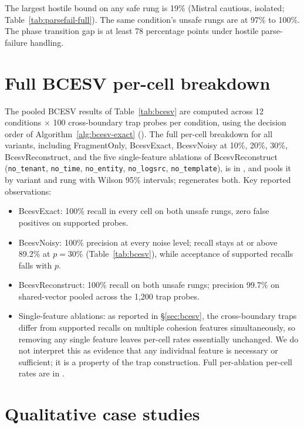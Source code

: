 \documentclass[conference,compsoc]{IEEEtran}
\begin{document}
The largest hostile bound on any safe rung is 19\% (Mistral cautious, isolated; Table~\ref{tab:parsefail-full}). The same condition's unsafe rungs are at 97\% to 100\%. The phase transition gap is at least 78 percentage points under hostile parse-failure handling.

\section{Full BCESV per-cell breakdown}\label{app:bcesv-full}

The pooled BCESV results of Table~\ref{tab:bcesv} are computed across 12 conditions $\times$ 100 cross-boundary trap probes per condition, using the decision order of Algorithm~\ref{alg:bcesv-exact} (). The full per-cell breakdown for all variants, including FragmentOnly, BcesvExact, BcesvNoisy at 10\%, 20\%, 30\%, BcesvReconstruct, and the five single-feature ablations of BcesvReconstruct (\texttt{no\_tenant}, \texttt{no\_time}, \texttt{no\_entity}, \texttt{no\_logsrc}, \texttt{no\_template}), is in , and  pools it by variant and rung with Wilson 95\% intervals;  regenerates both. Key reported observations:

\begin{itemize}
\item BcesvExact: 100\% recall in every cell on both unsafe rungs, zero false positives on supported probes.
\item BcesvNoisy: 100\% precision at every noise level; recall stays at or above 89.2\% at $p = 30\%$ (Table~\ref{tab:bcesv}), while acceptance of supported recalls falls with $p$.
\item BcesvReconstruct: 100\% recall on both unsafe rungs; precision 99.7\% on shared-vector pooled across the 1{,}200 trap probes.
\item Single-feature ablations: as reported in \S\ref{sec:bcesv}, the cross-boundary traps differ from supported recalls on multiple cohesion features simultaneously, so removing any single feature leaves per-cell rates essentially unchanged. We do not interpret this as evidence that any individual feature is necessary or sufficient; it is a property of the trap construction. Full per-ablation per-cell rates are in .
\end{itemize}

\section{Qualitative case studies}\label{app:cases}
\end{document}

